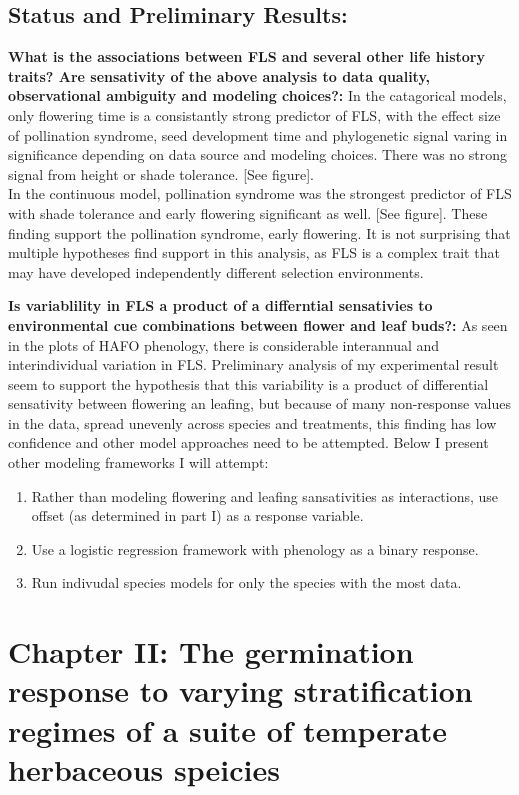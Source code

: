 \documentclass{article}\usepackage[]{graphicx}\usepackage[]{color}
\begin{document}
{\subsection*{Status and Preliminary Results:}
\indent\textbf{What is the associations between FLS and several other life history traits?  Are sensativity of the above analysis to data quality, observational ambiguity and modeling choices?:} In the catagorical models, only flowering time is a consistantly strong predictor of FLS, with the effect size of pollination syndrome, seed development time and phylogenetic signal varing in significance depending on data source and modeling choices. There was no strong signal from height or shade tolerance. [See figure].\\
In the continuous model, pollination syndrome was the strongest predictor of FLS with shade tolerance and early flowering significant as well. [See figure]. These finding support the pollination syndrome, early flowering. It is not surprising that multiple hypotheses find support in this analysis, as FLS is a complex trait that may have developed independently different selection environments.
\par\textbf{Is variablility in FLS a product of a differntial sensativies to environmental cue combinations between flower and leaf buds?:} As seen in the plots of HAFO phenology, there is considerable interannual and interindividual variation in FLS. Preliminary analysis of my experimental result seem to support the hypothesis that this variability is a product of differential sensativity between flowering an leafing, but because of many non-response values in the data, spread unevenly across species and treatments, this finding has low confidence and other model approaches need to be attempted. Below I present other modeling frameworks I will attempt:
\begin{enumerate}
\item Rather than modeling flowering and leafing sansativities as interactions, use offset (as determined in part I) as a response variable.
\item Use a logistic regression framework with phenology as a binary response.
\item Run indivudal species models for only the species with the most data.
\end{enumerate}

\section*{Chapter II: The germination response to varying stratification regimes of a suite of temperate herbaceous speicies}
}
\end{document}
